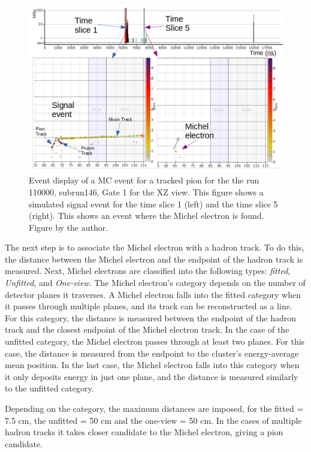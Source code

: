 \begin{itemize}
    \begin{figure}[!htb]
        \centering
        \includegraphics[scale=0.4]{Figures/Chapter4/DataSelection/EventDisplayMichelElectronRun110000SubRun146.png}
        \caption{Event display of a MC event for a tracked pion for the the run 110000, subrun146, Gate 1 for the XZ view. This figure shows a simulated signal event for the time slice 1 (left) and the time slice 5 (right). This shows an event where the Michel electron is found. Figure by the author. }
        \label{fig:Analysis:DataSelection:Cuts:Tracked:EventDisplayMETracked}
    \end{figure}

    The next step is to associate the Michel electron with a hadron track. To do this, the distance between the Michel electron and the endpoint of the hadron track is measured. Next, Michel electrons are classified into the following types: \textit{fitted}, \textit{Unfitted}, and \textit{One-view}. The Michel electron's category depends on the number of detector planes it traverses. A Michel electron falls into the fitted category when it passes through multiple planes, and its track can be reconstructed as a line. For this category, the distance is measured between the endpoint of the hadron track and the closest endpoint of the Michel electron track. In the case of the unfitted category, the Michel electron passes through at least two planes. For this case, the distance is measured from the endpoint to the cluster's energy-average mean position. In the last case, the Michel electron falls into this category when it only deposits energy in just one plane, and the distance is measured similarly to the unfitted category. 

    Depending on the category, the maximum distances are imposed, for the fitted = 7.5 cm, the unfitted = 50 cm and the one-view = 50 cm. In the cases of multiple hadron tracks it takes closer candidate to the Michel electron, giving a pion candidate. 
    

\end{itemize}
